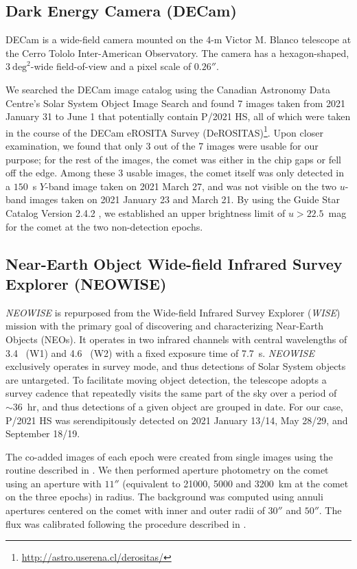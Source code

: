 \documentclass[modern]{aastex631}
\begin{document}
\begin{CJK*}{UTF8}{gbsn}
\subsection{Dark Energy Camera (DECam)}

DECam is a wide-field camera mounted on the 4-m Victor M. Blanco telescope at the Cerro Tololo Inter-American Observatory. The camera has a hexagon-shaped, $3~\mathrm{deg}^2$-wide field-of-view and a pixel scale of $0.26''$.

We searched the DECam image catalog using the Canadian Astronomy Data Centre's Solar System Object Image Search \citep{Gwyn2012} and found 7 images taken from 2021 January 31 to June 1 that potentially contain P/2021 HS, all of which were taken in the course of the DECam eROSITA Survey (DeROSITAS)\footnote{\url{http://astro.userena.cl/derositas/}}. Upon closer examination, we found that only 3 out of the 7 images were usable for our purpose; for the rest of the images, the comet was either in the chip gaps or fell off the edge. Among these 3 usable images, the comet itself was only detected in a $150$~s $Y$-band image taken on 2021 March 27, and was not visible on the two $u$-band images taken on 2021 January 23 and March 21. By using the Guide Star Catalog Version 2.4.2 \citep{Lasker2021}, we established an upper brightness limit of $u>22.5$~mag for the comet at the two non-detection epochs.

\subsection{Near-Earth Object Wide-field Infrared Survey Explorer (NEOWISE)}

{\it NEOWISE} is repurposed from the Wide-field Infrared Survey Explorer ({\it WISE}) mission with the primary goal of discovering and characterizing Near-Earth Objects (NEOs). It operates in two infrared channels with central wavelengths of 3.4~\micron{} (W1) and 4.6~\micron{} (W2) with a fixed exposure time of 7.7~s. {\it NEOWISE} exclusively operates in survey mode, and thus detections of Solar System objects are untargeted. To facilitate moving object detection, the telescope adopts a survey cadence that repeatedly visits the same part of the sky over a period of $\sim36$~hr, and thus detections of a given object are grouped in date. For our case, P/2021 HS was serendipitously detected on 2021 January 13/14, May 28/29, and September 18/19.

The co-added images of each epoch were created from single images using the routine described in \citet{Masci2009}. We then performed aperture photometry on the comet using an aperture with $11''$ (equivalent to 21000, 5000 and 3200~km at the comet on the three epochs) in radius. The background was computed using annuli apertures centered on the comet with inner and outer radii of $30''$ and $50''$. The flux was calibrated following the procedure described in \citet{Bauer2015, Bauer2017}.



\end{CJK*}
\end{document}
